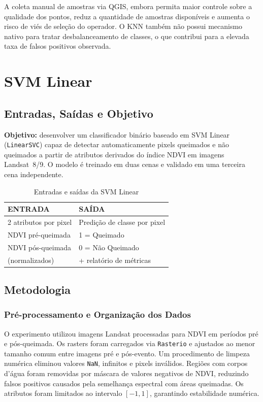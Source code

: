 \documentclass[conference]{IEEEtran}
\begin{document}
A coleta manual de amostras via QGIS, embora permita maior controle sobre
a qualidade dos pontos, reduz a quantidade de amostras disponíveis e
aumenta o risco de viés de seleção do operador. O KNN também não possui
mecanismo nativo para tratar desbalanceamento de classes, o que contribui
para a elevada taxa de falsos positivos observada.

\section{SVM Linear}

\subsection{Entradas, Saídas e Objetivo}

\textbf{Objetivo:} desenvolver um classificador binário baseado em SVM
Linear (\texttt{LinearSVC}) capaz de detectar automaticamente pixels
queimados e não queimados a partir de atributos derivados do índice NDVI
em imagens Landsat~8/9. O modelo é treinado em duas cenas e validado em
uma terceira cena independente.

\begin{table}[!t]
  \caption{Entradas e saídas da SVM Linear}
  \label{tab:svm_linear_io}
  \centering
  \begin{tabular}{ll}
    \toprule
    \textbf{ENTRADA} & \textbf{SAÍDA} \\
    \midrule
    2 atributos por pixel & Predição de classe por pixel \\
    NDVI pré-queimada & 1 = Queimado \\
    NDVI pós-queimada & 0 = Não Queimado \\
    (normalizados) & + relatório de métricas \\
    \bottomrule
  \end{tabular}
\end{table}

\subsection{Metodologia}

\subsubsection{Pré-processamento e Organização dos Dados}

O experimento utilizou imagens Landsat processadas para NDVI em períodos
pré e pós-queimada. Os rasters foram carregados via \texttt{Rasterio} e
ajustados ao menor tamanho comum entre imagens pré e pós-evento. Um
procedimento de limpeza numérica eliminou valores \texttt{NaN}, infinitos
e pixels inválidos. Regiões com corpos d'água foram removidas por máscara
de valores negativos de NDVI, reduzindo falsos positivos causados pela
semelhança espectral com áreas queimadas. Os atributos foram limitados
ao intervalo $[-1, 1]$, garantindo estabilidade numérica.
\end{document}
